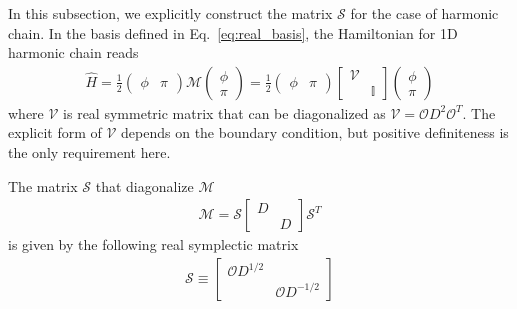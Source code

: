 In this subsection, we explicitly construct the matrix $\mathcal{S}$ for the case of harmonic chain. In the basis defined in Eq.~\eqref{eq:real_basis}, the Hamiltonian for 1D harmonic chain reads
\begin{equation}\begin{aligned}
\hat{H}
=\frac{1}{2}
\begin{pmatrix}
\phi & \pi
\end{pmatrix}
\mathcal{M}
\begin{pmatrix}
\phi\\
\pi
\end{pmatrix}
=\frac{1}{2}
\begin{pmatrix}
\phi & \pi
\end{pmatrix}
\begin{bmatrix}
\mathcal{V} \\
& {\mathbb{ I}}
\end{bmatrix}
\begin{pmatrix}
\phi\\
\pi
\end{pmatrix}
\end{aligned}\end{equation}
where $\mathcal{V}$ is real symmetric matrix that can be diagonalized as $\mathcal{V}=\mathcal{O}D^2\mathcal{O}^T$. The explicit form of $\mathcal{V}$ depends on the boundary condition, but positive definiteness is the only requirement here. 

The matrix $\mathcal{S}$ that diagonalize $\mathcal{M}$
\begin{equation}
\begin{aligned}
\mathcal{M}=\mathcal{S}
\begin{bmatrix}
D \\ 
& D
\end{bmatrix}
\mathcal{S}^T
\end{aligned}
\end{equation}
is given by the following real symplectic matrix
\begin{equation}\begin{aligned}
\mathcal{S}\equiv
\begin{bmatrix}
\mathcal{O}D^{1/2} \\
& \mathcal{O}D^{-1/2}
\end{bmatrix}
\end{aligned}\end{equation}


